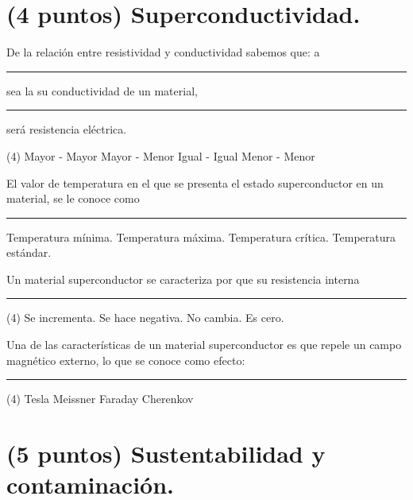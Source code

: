 \documentclass[12pt, letter]{exam}
\begin{document}
\begin{questions}
    \section{(4 puntos) Superconductividad.}

    \question De la relación entre resistividad y conductividad sabemos que: a \rule{2cm}{0.1mm} sea la su conductividad de un material, \rule{2cm}{0.1mm} será resistencia eléctrica.
    \begin{tasks}(4)
        \task Mayor - Mayor
        \task Mayor - Menor
        \task Igual - Igual
        \task Menor - Menor
    \end{tasks}
    \question El valor de temperatura en el que se presenta el estado superconductor en un material, se le conoce como \rule{2cm}{0.1mm}
    \begin{multicols}{2}
    \begin{tasks}
        \task Temperatura mínima.
        \task Temperatura máxima.
        \task Temperatura crítica.
        \task Temperatura estándar.
    \end{tasks}
    \end{multicols}
    \question Un material superconductor se caracteriza por que su resistencia interna \rule{2cm}{0.1mm}
    \begin{tasks}(4)
        \task Se incrementa.
        \task Se hace negativa.
        \task No cambia.
        \task Es cero.
    \end{tasks}
    \question Una de las características de un material superconductor es que repele un campo magnético externo, lo que se conoce como efecto: \rule{2cm}{0.1mm}
    \begin{tasks}(4)
        \task Tesla
        \task Meissner
        \task Faraday
        \task Cherenkov
    \end{tasks}

    \section{(5 puntos) Sustentabilidad y contaminación.}


\end{questions}
\end{document}
